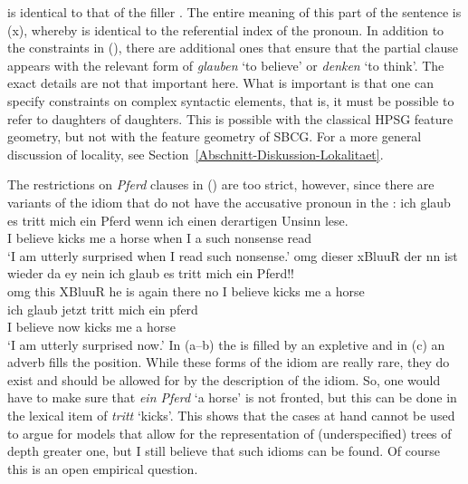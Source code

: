   is identical to that of the filler . The entire meaning of this part of the sentence is (x),
  whereby  is identical to the referential index of the pronoun.
 In addition to the constraints in (), there are additional ones that ensure that the partial clause appears with the relevant
 form of \emph{glauben} `to believe' or \emph{denken} `to think'. The exact details are not that important here. What is important is that one can specify constraints
 on complex syntactic elements, that is, it must be possible to refer to daughters of
 daughters. This is possible with the classical HPSG feature geometry, but not with the feature
 geometry of SBCG. For a more general discussion of locality, see
 Section~\ref{Abschnitt-Diskussion-Lokalitaet}. 

\largerpage[2]
The restrictions on \emph{Pferd} clauses in () are too strict, however, since there are
variants of the idiom that do not have the accusative pronoun in the \vf:
\eal
\ex 
\gll ich glaub es tritt mich ein Pferd wenn ich einen derartigen Unsinn lese.\footnotemark\\
     I believe \expl{} kicks me a horse when I a such nonsense read\\
\glt `I am utterly surprised when I read such nonsense.'
\ex 
\gll omg dieser xBluuR der nn ist wieder da ey nein ich glaub es tritt mich ein Pferd!!\footnotemark\\
    omg this   XBluuR he  {} is  again there {} no I believe \expl{} kicks me a horse\\
\ex 
\gll ich glaub jetzt tritt mich ein pferd\footnotemark\\
    I believe now   kicks me a horse\\
\glt `I am utterly surprised now.'
\zl
In (a--b) the \vf is filled by an expletive and in (c) an adverb fills the \vf position.
While these forms of the idiom are really rare, they do exist and should be allowed for by the
description of the idiom. So, one would have to make sure that \emph{ein Pferd} `a horse' is not
fronted, but this can be done in the lexical item of \emph{tritt} `kicks'. This shows that the cases
at hand cannot be used to argue for models that allow for the representation of (underspecified)
trees of depth greater one, but I still believe that such idioms can be found. Of course this is an
open empirical question. 


